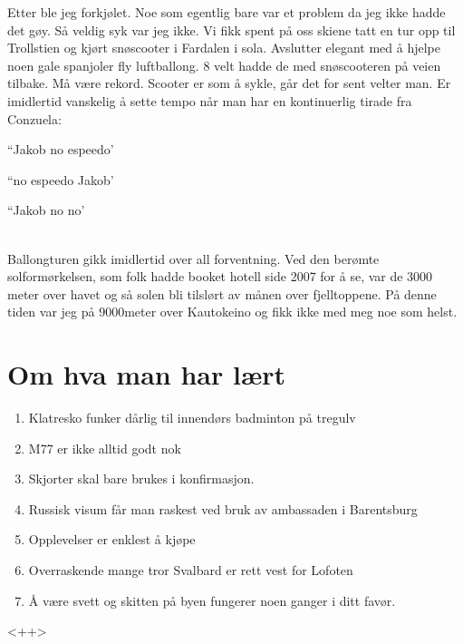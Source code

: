 Etter
ble jeg forkjølet. Noe som egentlig bare var et problem da jeg ikke
hadde det gøy. Så veldig syk var jeg ikke. Vi fikk spent på oss skiene
tatt en tur opp til Trollstien og kjørt snøscooter
i Fardalen i sola. Avslutter elegant med å  hjelpe noen gale spanjoler
fly luftballong. 8 velt hadde de med snøscooteren på veien tilbake. Må
være rekord. Scooter er som å sykle, går det for sent velter man. Er
imidlertid vanskelig å sette tempo når man har en kontinuerlig tirade
fra Conzuela:
\begin{dialogue}
	\item ``Jakob no espeedo'
	\item ``no espeedo Jakob'
	\item ``Jakob no no'
\end{dialogue}
\\

Ballongturen gikk imidlertid over all forventning. Ved den berømte
solformørkelsen, som folk hadde booket hotell side 2007 for å se, var
de 3000 meter over havet og så solen bli tilslørt av månen over
fjelltoppene. På denne tiden var
jeg på 9000meter over Kautokeino og fikk ikke med meg noe som helst. 


\section{Om hva man har lært}

\begin{enumerate}
	\item Klatresko funker dårlig til innendørs badminton på
		tregulv
	\item M77 er ikke alltid godt nok
	\item Skjorter skal bare brukes i konfirmasjon.
	\item Russisk visum får man raskest ved bruk av ambassaden i
		Barentsburg
	\item Opplevelser er enklest å kjøpe
	\item Overraskende mange tror Svalbard er rett vest for
		Lofoten
	\item Å være svett og skitten på byen fungerer noen ganger i
		ditt favør.
\end{enumerate}<++>
